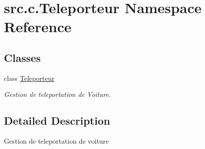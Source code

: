 \hypertarget{namespacesrc_1_1c_1_1_teleporteur}{}\section{src.\+c.\+Teleporteur Namespace Reference}
\label{namespacesrc_1_1c_1_1_teleporteur}
\subsection*{Classes}
\begin{DoxyCompactItemize}
\item 
class \hyperlink{classsrc_1_1c_1_1_teleporteur_1_1_teleporteur}{Teleporteur}
\begin{DoxyCompactList}\small\item\em Gestion de teleportation de Voiture. \end{DoxyCompactList}\end{DoxyCompactItemize}


\subsection{Detailed Description}
\begin{DoxyVerb}    Gestion de teleportation de voiture
\end{DoxyVerb}
 